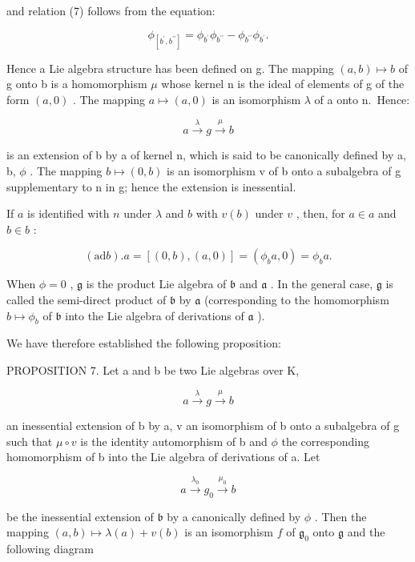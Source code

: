 and relation (7) follows from the equation:

\[
\phi_ {[ b ^ {\prime}, b ^ {\prime \prime} ]} = \phi_ {b ^ {\prime}} \phi_ {b ^ {\prime \prime}} - \phi_ {b ^ {\prime \prime}} \phi_ {b ^ {\prime}}.
\]

Hence a Lie algebra structure has been defined on g. The mapping \((a, b) \mapsto b\) of g onto b is a homomorphism \(\mu\) whose kernel n is the ideal of elements of g of the form \((a, 0)\) . The mapping \(a \mapsto (a, 0)\) is an isomorphism \(\lambda\) of a onto n.~Hence:

\[
a \xrightarrow {\lambda} g \xrightarrow {\mu} b\tag{12}
\]

is an extension of b by a of kernel n, which is said to be canonically defined by a, b, \(\phi\) . The mapping \(b \mapsto (0, b)\) is an isomorphism v of b onto a subalgebra of g supplementary to n in g; hence the extension is inessential.

If \(a\) is identified with \(n\) under \(\lambda\) and \(b\) with \(v(b)\) under \(v\) , then, for \(a \in a\) and \(b \in b\) :

\[
(\mathrm{ad} b). a = [ (0, b), (a, 0) ] = (\phi_ {b} a, 0) = \phi_ {b} a.
\]

When \(\phi = 0\) , \(\mathfrak{g}\) is the product Lie algebra of \(\mathfrak{b}\) and \(\mathfrak{a}\) . In the general case, \(\mathfrak{g}\) is called the semi-direct product of \(\mathfrak{b}\) by \(\mathfrak{a}\) (corresponding to the homomorphism \(b \mapsto \phi_b\) of \(\mathfrak{b}\) into the Lie algebra of derivations of \(\mathfrak{a}\) ).

We have therefore established the following proposition:

PROPOSITION 7. Let a and b be two Lie algebras over K,

\[
a \xrightarrow {\lambda} g \xrightarrow {\mu} b
\]

an inessential extension of b by a, v an isomorphism of b onto a subalgebra of g such that \(\mu \circ v\) is the identity automorphism of b and \(\phi\) the corresponding homomorphism of b into the Lie algebra of derivations of a. Let

\[
a \xrightarrow {\lambda_ {0}} g _ {0} \xrightarrow {\mu_ {0}} b
\]

be the inessential extension of \(\mathfrak{b}\) by a canonically defined by \(\phi\) . Then the mapping \((a, b) \mapsto \lambda(a) + v(b)\) is an isomorphism \(f\) of \(\mathfrak{g}_0\) onto \(\mathfrak{g}\) and the following diagram

